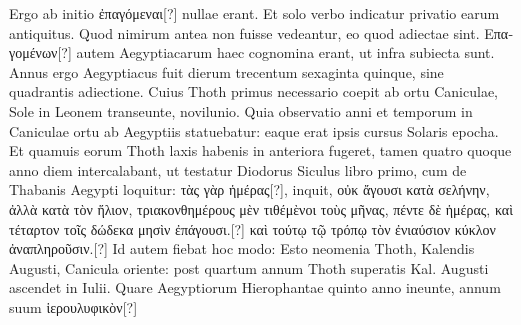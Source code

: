 Ergo ab initio \textgreek{ἐπαγόμεναι}[?]
nullae erant.
Et solo
verbo indicatur privatio earum
antiquitus.
Quod nimirum antea
non fuisse vedeantur, eo
quod adiectae sint.
%
%
\textgreek{Επαγομένων}[?]
autem Aegyptiacarum haec cognomina erant, ut infra subiecta sunt.
Annus ergo Aegyptiacus fuit dierum trecentum sexaginta quinque,
sine quadrantis adiectione.
Cuius Thoth primus necessario coepit ab
ortu Caniculae, Sole in Leonem transeunte, novilunio.
Quia
observatio anni et temporum in Caniculae ortu ab Aegyptiis statuebatur:
eaque erat ipsis cursus Solaris epocha.
Et quamuis eorum Thoth
laxis habenis in anteriora fugeret, tamen quatro quoque anno diem
intercalabant, ut testatur Diodorus Siculus libro primo, cum de
Thabanis Aegypti loquitur: \textgreek{τὰς γὰρ ἡμέρας}[?], inquit,
 \textgreek{οὐκ ἄγουσι κατὰ σελήνην,
ἀλλὰ κατὰ τὸν ἥλιον, τριακονθημέρους μὲν τιθέμὲνοι τοὺς μῆνας, πέντε
δὲ ἡμέρας, καὶ τέταρτον τοῖς δώδεκα μησὶν ἐπάγουσι.}[?]
\textgreek{καὶ τούτῳ τῷ τρόπῳ τὸν ἐνιαύσιον κύκλον ἀναπληροῦσιν.}[?]
Id autem fiebat hoc modo: Esto neomenia
Thoth, Kalendis Augusti, Canicula oriente: post quartum annum
Thoth superatis Kal. Augusti ascendet in  Iulii.
Quare Aegyptiorum
Hierophantae quinto anno ineunte, annum suum \textgreek{ἱερουλυφικὸν}[?]
